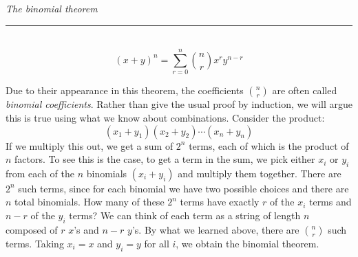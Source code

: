 \documentclass[12pt]{article}
\theoremstyle{definition}
\theoremstyle{remark}
\begin{document}
\begin{framed}
\emph{The binomial theorem}\\
  \rule{\dimexpr{}\fboxrule}{.1pt} \\
\[
(x+y)^n = \sum_{r=0}^n \binom{n}{r}x^r y^{n-r}
\]
\end{framed}
Due to their appearance in this theorem, the coefficients $\binom{n}{r}$ are often called \emph{binomial coefficients}. Rather than give the usual proof by induction, we will argue this is true using what we know about combinations. Consider the product:
\[
(x_1 + y_1)(x_2 + y_2)\cdots(x_n + y_n)
\]
If we multiply this out, we get a sum of $2^n$ terms, each of which is the product of $n$ factors. To see this is the case, to get a term in the sum, we pick either $x_i$ or $y_i$ from each of the $n$ binomials $(x_i + y_i)$ and multiply them together. There are $2^n$ such terms, since for each binomial we have two possible choices and there are $n$ total binomials. How many of these $2^n$ terms have exactly $r$ of the $x_i$ terms and $n-r$ of the $y_i$ terms? We can think of each term as a string of length $n$ composed of $r$ $x$'s and $n-r$ $y$'s. By what we learned above, there are $\binom{n}{r}$ such terms. Taking $x_i = x$ and $y_i = y$ for all $i$, we obtain the binomial theorem.
\end{document}
